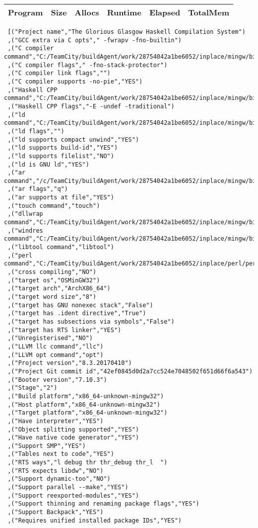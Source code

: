 \begin{tabular}{ c c c c c c }
Program & Size & Allocs & Runtime & Elapsed & TotalMem\\
\hline
\end{tabular}
\begin{verbatim}
 [("Project name","The Glorious Glasgow Haskell Compilation System")
 ,("GCC extra via C opts"," -fwrapv -fno-builtin")
 ,("C compiler command","C:/TeamCity/buildAgent/work/28754042a1be6052/inplace/mingw/bin/gcc.exe")
 ,("C compiler flags"," -fno-stack-protector")
 ,("C compiler link flags","")
 ,("C compiler supports -no-pie","YES")
 ,("Haskell CPP command","C:/TeamCity/buildAgent/work/28754042a1be6052/inplace/mingw/bin/gcc.exe")
 ,("Haskell CPP flags","-E -undef -traditional")
 ,("ld command","C:/TeamCity/buildAgent/work/28754042a1be6052/inplace/mingw/bin/ld.exe")
 ,("ld flags","")
 ,("ld supports compact unwind","YES")
 ,("ld supports build-id","YES")
 ,("ld supports filelist","NO")
 ,("ld is GNU ld","YES")
 ,("ar command","/c/TeamCity/buildAgent/work/28754042a1be6052/inplace/mingw/bin/ar")
 ,("ar flags","q")
 ,("ar supports at file","YES")
 ,("touch command","touch")
 ,("dllwrap command","C:/TeamCity/buildAgent/work/28754042a1be6052/inplace/mingw/bin/dllwrap.exe")
 ,("windres command","C:/TeamCity/buildAgent/work/28754042a1be6052/inplace/mingw/bin/windres.exe")
 ,("libtool command","libtool")
 ,("perl command","C:/TeamCity/buildAgent/work/28754042a1be6052/inplace/perl/perl")
 ,("cross compiling","NO")
 ,("target os","OSMinGW32")
 ,("target arch","ArchX86_64")
 ,("target word size","8")
 ,("target has GNU nonexec stack","False")
 ,("target has .ident directive","True")
 ,("target has subsections via symbols","False")
 ,("target has RTS linker","YES")
 ,("Unregisterised","NO")
 ,("LLVM llc command","llc")
 ,("LLVM opt command","opt")
 ,("Project version","8.3.20170410")
 ,("Project Git commit id","42ef0845d0d2a7cc524e7048502f651d66f6a543")
 ,("Booter version","7.10.3")
 ,("Stage","2")
 ,("Build platform","x86_64-unknown-mingw32")
 ,("Host platform","x86_64-unknown-mingw32")
 ,("Target platform","x86_64-unknown-mingw32")
 ,("Have interpreter","YES")
 ,("Object splitting supported","YES")
 ,("Have native code generator","YES")
 ,("Support SMP","YES")
 ,("Tables next to code","YES")
 ,("RTS ways","l debug thr thr_debug thr_l  ")
 ,("RTS expects libdw","NO")
 ,("Support dynamic-too","NO")
 ,("Support parallel --make","YES")
 ,("Support reexported-modules","YES")
 ,("Support thinning and renaming package flags","YES")
 ,("Support Backpack","YES")
 ,("Requires unified installed package IDs","YES")

\end{verbatim}
